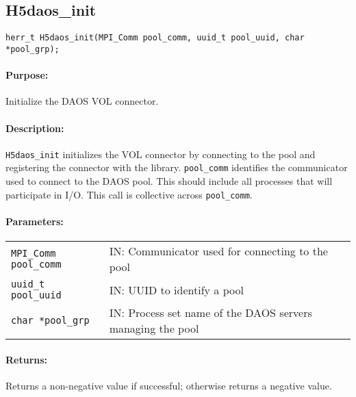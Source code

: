 \subsection{H5daos\_init}

\begin{verbatim}
herr_t H5daos_init(MPI_Comm pool_comm, uuid_t pool_uuid, char *pool_grp);
\end{verbatim}

\paragraph{Purpose:}
\begin{flushleft}%
Initialize the DAOS VOL connector.
\end{flushleft}%

\paragraph{Description:}
\begin{flushleft}%
\texttt{H5daos\_init} initializes the VOL connector by connecting to the pool
and registering the connector with the library. \texttt{pool\_comm}
identifies the communicator used to connect to the DAOS pool.  This should
include all processes that will participate in I/O. This call is collective
across \texttt{pool\_comm}.
\end{flushleft}%

\paragraph{Parameters:}
\begin{flushleft}%
 \begin{tabular}{ll}%
   \texttt{MPI\_Comm pool\_comm} & IN: Communicator used for connecting to the pool \\
   \texttt{uuid\_t pool\_uuid} & IN: UUID to identify a pool \\
   \texttt{char *pool\_grp} & IN: Process set name of the DAOS servers managing the pool \\
 \end{tabular}%
\end{flushleft}%

\paragraph{Returns:}
\begin{flushleft}%
Returns a non-negative value if successful; otherwise returns a negative value.
\end{flushleft}%

